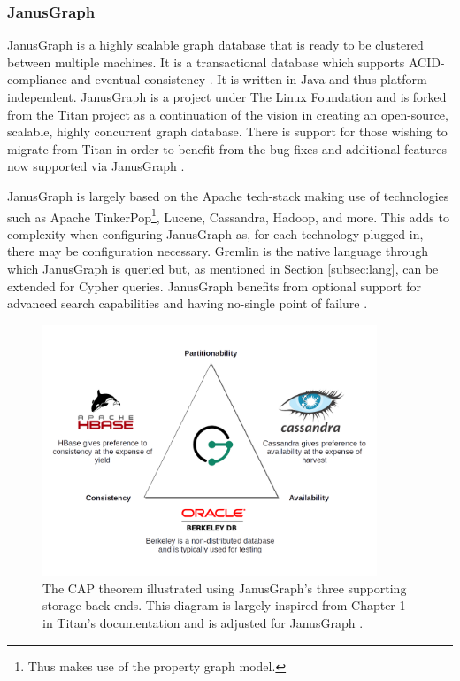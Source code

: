 \subsubsection{JanusGraph}

JanusGraph is a highly scalable graph database that is ready to be clustered between multiple machines. It is a transactional database which supports ACID-compliance and eventual consistency \cite{janusgraph-main}. It is written in Java and thus platform independent. JanusGraph is a project under The Linux Foundation and is forked from the Titan project as a continuation of the vision in creating an open-source, scalable, highly concurrent graph database. There is support for those wishing to migrate from Titan in order to benefit from the bug fixes and additional features now supported via JanusGraph \cite{janusgraph-titan}.

JanusGraph is largely based on the Apache tech-stack making use of technologies such as Apache TinkerPop\footnote{Thus makes use of the property graph model.}, Lucene, Cassandra, Hadoop, and more. This adds to complexity when configuring JanusGraph as, for each technology plugged in, there may be configuration necessary. Gremlin is the native language through which JanusGraph is queried but, as mentioned in Section \ref{subsec:lang}, can be extended for Cypher queries. JanusGraph benefits from optional support for advanced search capabilities and having no-single point of failure \cite{janusgraph-docs}.

\begin{figure}[h]
    \centering
    \includegraphics[width=10cm]{img/CAP-JanusGraph.png}
    \caption{The CAP theorem illustrated using JanusGraph's three supporting storage back ends. This diagram is largely inspired from Chapter 1 in Titan's documentation and is adjusted for JanusGraph \cite{titan-cap}.}
    \label{fig:janusgraph-cap}
\end{figure}

